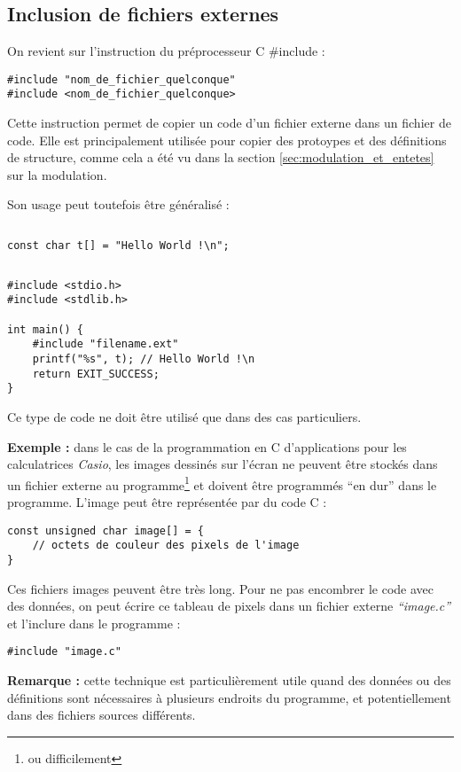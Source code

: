 \documentclass[../../../main.tex]{subfiles}
\begin{document}
\subsection{Inclusion de fichiers externes}
\label{ssub:inclusion_de_fichiers_externes}
On revient sur l'instruction du préprocesseur C \textsf{\#include} :
\begin{verbatim}
#include "nom_de_fichier_quelconque"
#include <nom_de_fichier_quelconque>
\end{verbatim}
Cette instruction permet de copier un code d'un fichier externe dans un fichier de code. Elle est principalement utilisée pour copier des protoypes et des définitions de structure, comme cela a été vu dans la section \ref{sec:modulation_et_entetes} sur la modulation.

Son usage peut toutefois être généralisé :
\begin{lstlisting}[title=filename.ext]
\end{lstlisting}
\begin{verbatim}
const char t[] = "Hello World !\n";
\end{verbatim}
\begin{lstlisting}[title=main.c]
\end{lstlisting}
\begin{verbatim}
#include <stdio.h>
#include <stdlib.h>

int main() {
	#include "filename.ext"
	printf("%s", t); // Hello World !\n
	return EXIT_SUCCESS;
}
\end{verbatim}
Ce type de code ne doit être utilisé que dans des cas particuliers.

\textbf{Exemple :} dans le cas de la programmation en C d'applications pour les calculatrices \textit{Casio}, les images dessinés sur l'écran ne peuvent être stockés dans un fichier externe au programme\footnote{ou difficilement} et doivent être programmés ``en dur'' dans le programme. L'image peut être représentée par du code C :
\begin{verbatim}
const unsigned char image[] = {
	// octets de couleur des pixels de l'image
}
\end{verbatim}
Ces fichiers images peuvent être très long. Pour ne pas encombrer le code avec des données, on peut écrire ce tableau de pixels dans un fichier externe \textit{``image.c''} et l'inclure dans le programme :
\begin{verbatim}
#include "image.c"
\end{verbatim}
\textbf{Remarque :} cette technique est particulièrement utile quand des données ou des définitions sont nécessaires à plusieurs endroits du programme, et potentiellement dans des fichiers sources différents.
\end{document}
